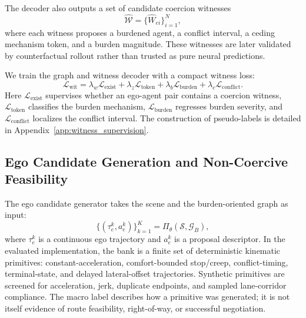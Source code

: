 \documentclass[10pt]{article}
\begin{document}
The decoder also outputs a set of candidate coercion witnesses
\begin{equation}
    \widehat{\mathcal{W}} =
    \{ \widehat{W}_{ei} \}_{i=1}^{N},
\end{equation}
where each witness proposes a burdened agent, a conflict interval, a ceding mechanism token, and a burden magnitude. These witnesses are later validated by counterfactual rollout rather than trusted as pure neural predictions.

We train the graph and witness decoder with a compact witness loss:
\begin{equation}
    \mathcal{L}_{\mathrm{wit}}
    =
    \lambda_w \mathcal{L}_{\mathrm{exist}}
    +
    \lambda_z \mathcal{L}_{\mathrm{token}}
    +
    \lambda_b \mathcal{L}_{\mathrm{burden}}
    +
    \lambda_c \mathcal{L}_{\mathrm{conflict}} .
\end{equation}
Here $\mathcal{L}_{\mathrm{exist}}$ supervises whether an ego-agent pair contains a coercion witness, $\mathcal{L}_{\mathrm{token}}$ classifies the burden mechanism, $\mathcal{L}_{\mathrm{burden}}$ regresses burden severity, and $\mathcal{L}_{\mathrm{conflict}}$ localizes the conflict interval. The construction of pseudo-labels is detailed in Appendix~\ref{app:witness_supervision}.

\subsection{Ego Candidate Generation and Non-Coercive Feasibility}
\label{sec:method_candidate}

The ego candidate generator takes the scene and the burden-oriented graph as input:
\begin{equation}
    \{(\tau^k_e, a^k_e)\}_{k=1}^{K}
    =
    \Pi_{\theta}(\mathcal{S}, \mathcal{G}_B),
\end{equation}
where $\tau^k_e$ is a continuous ego trajectory and $a^k_e$ is a proposal descriptor. In the evaluated implementation, the bank is a finite set of deterministic kinematic primitives: constant-acceleration, comfort-bounded stop/creep, conflict-timing, terminal-state, and delayed lateral-offset trajectories. Synthetic primitives are screened for acceleration, jerk, duplicate endpoints, and sampled lane-corridor compliance. The macro label describes how a primitive was generated; it is not itself evidence of route feasibility, right-of-way, or successful negotiation.
\end{document}
